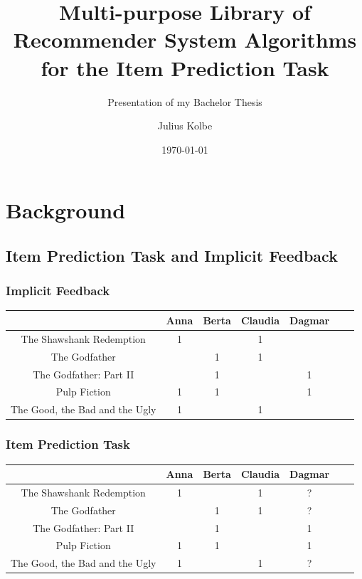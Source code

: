 \documentclass{beamer}
\title[Multi-purpose Library of Recommender System Algorithms]
{Multi-purpose Library of Recommender System Algorithms for the Item Prediction Task}
\subtitle{Presentation of my Bachelor Thesis}
\author{Julius Kolbe}
\institute{Fakult\"at f\"ur Elektrotechnik und Informatik\\Institut f\"ur Verteilte Systeme}
\date{\today}
\begin{document}
\frame{\titlepage} %

\section{Background}
\subsection{Item Prediction Task and Implicit Feedback}
\begin{frame}
\frametitle{Implicit Feedback}

\begin{table}[t]
\begin{tabular}{c|cccccc}
    &Anna&Berta&Claudia&Dagmar\\\hline
    The Shawshank Redemption&1&&1&\\
    The Godfather&&1&1&\\
    The Godfather: Part II&&1&&1\\
    Pulp Fiction&1&1&&1\\
    The Good, the Bad and the Ugly&1&&1&\\
\end{tabular}
\end{table}
\end{frame}
\begin{frame}
\frametitle{Item Prediction Task}

\begin{table}[t]
\begin{tabular}{c|cccccc}
    &Anna&Berta&Claudia&Dagmar\\\hline
    The Shawshank Redemption&1&&1&?\\
    The Godfather&&1&1&?\\
    The Godfather: Part II&&1&&1\\
    Pulp Fiction&1&1&&1\\
    The Good, the Bad and the Ugly&1&&1&?\\
\end{tabular}
\end{table}

\end{frame}
\end{document}
